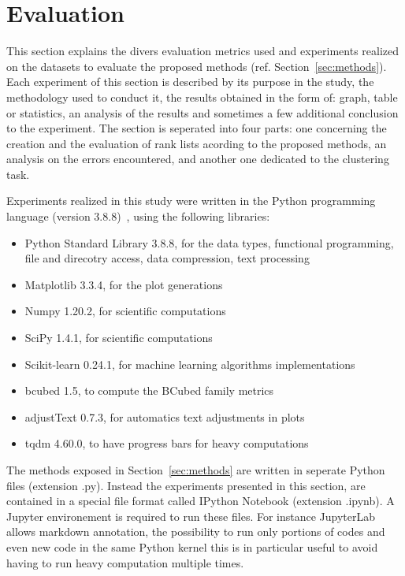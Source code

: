 \section{Evaluation \label{sec:evaluation}}

This section explains the divers evaluation metrics used and experiments realized on the datasets to evaluate the proposed methods (ref. Section~\ref{sec:methods}).
Each experiment of this section is described by its purpose in the study, the methodology used to conduct it, the results obtained in the form of: graph, table or statistics, an analysis of the results and sometimes a few additional conclusion to the experiment.
The section is seperated into four parts: one concerning the creation and the evaluation of rank lists acording to the proposed methods, an analysis on the errors encountered,  and another one dedicated to the clustering task.

Experiments realized in this study were written in the Python programming language (version 3.8.8)~\cite{python}, using the following libraries:
\begin{itemize}
  \item Python Standard Library 3.8.8, for the data types, functional programming, file and direcotry access, data compression, text processing~\cite{python_standard_library}
  \item Matplotlib 3.3.4, for the plot generations~\cite{matplotlib}
  \item Numpy 1.20.2, for scientific computations~\cite{numpy}
  \item SciPy 1.4.1, for scientific computations~\cite{scipy}
  \item Scikit-learn 0.24.1, for machine learning algorithms implementations~\cite{sklearn}
  \item bcubed 1.5, to compute the BCubed family metrics~\cite{bcubed_gh}
  \item adjustText 0.7.3, for automatics text adjustments in plots~\cite{adjustText}
  \item tqdm 4.60.0, to have progress bars for heavy computations~\cite{tqdm}
\end{itemize}
The methods exposed in Section~\ref{sec:methods} are written in seperate Python files (extension .py).
Instead the experiments presented in this section, are contained in a special file format called IPython Notebook (extension .ipynb).
A Jupyter environement is required to run these files.
For instance JupyterLab allows markdown annotation, the possibility to run only portions of codes and even new code in the same Python kernel this is in particular useful to avoid having to run heavy computation multiple times.





